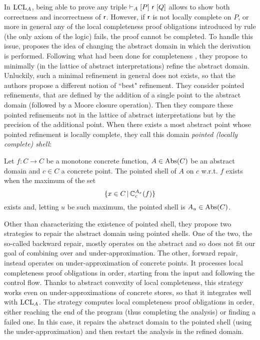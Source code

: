 In $\text{LCL}_A$, being able to prove any triple $\vdash_{A}\nobreak[P]~\mathsf{r}~[Q]$ allows to show both correctness and incorrectness of $\mathsf{r}$. However, if $\mathsf{r}$ is not locally complete on $P$, or more in general any of the local completeness proof obligations introduced by rule  (the only axiom of the logic) fails, the proof cannot be completed.
To handle this issue, \cite{BGGR22} proposes the idea of changing the abstract domain in which the derivation is performed. Following what had been done for completeness \cite{GRS00}, they propose to minimally (in the lattice of abstract interpretations) refine the abstract domain. Unluckily, such a minimal refinement in general does not exists, so that the authors propose a different notion of ``best" refinement. They consider pointed refinements, that are defined by the addition of a single point to the abstract domain (followed by a Moore closure operation). Then they compare these pointed refinements not in the lattice of abstract interpretations but by the precision of the additional point. When there exists a most abstract point whose pointed refinement is locally complete, they call this domain \emph{pointed (locally complete) shell}:
\begin{definition}
	Let $f : C \rightarrow C$ be a monotone concrete function, $A \in \text{\normalfont Abs}(C)$ be an abstract domain and $c \in C$ a concrete point. The pointed shell of $A$ on $c$ w.r.t. $f$ exists when the maximum of the set
	\[
	\{ x \in C \,\vert\, \mathbb{C}^{A_x}_{c}(f) \}
	\]
	exists and, letting $u$ be such maximum, the pointed shell is $A_u \in \text{\normalfont Abs}(C)$.
\end{definition}

Other than characterizing the existence of pointed shell, they propose two strategies to repair the abstract domain using pointed shells. One of the two, the so-called backward repair, mostly operates on the abstract and so does not fit our goal of combining over and under-approximation.
The other, forward repair, instead operates on under-approximation of concrete points. It processes local completeness proof obligations in order, starting from the input and following the control flow. Thanks to abstract convexity of local completeness, this strategy works even on under-approximations of concrete stores, so that it integrates well with $\text{LCL}_A$. The strategy computes local completeness proof obligations in order, either reaching the end of the program (thus completing the analysis) or finding a failed one. In this case, it repairs the abstract domain to the pointed shell (using the under-approximation) and then restart the analysis in the refined domain.

